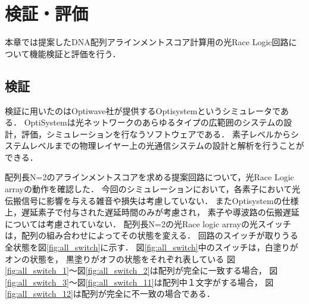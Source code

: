 \chapter{検証・評価}
本章では提案したDNA配列アラインメントスコア計算用の光Race Logic回路について機能検証と評価を行う．
\section{検証}
検証に用いたのはOptiwave社が提供するOptisystemというシミュレータである．
OptiSystemは光ネットワークのあらゆるタイプの広範囲のシステムの設計，評価，シミュレーションを行なうソフトウェアである．
素子レベルからシステムレベルまでの物理レイヤー上の光通信システムの設計と解析を行うことができる．

配列長N=2のアラインメントスコアを求める提案回路について，光Race Logic arrayの動作を確認した．
今回のシミュレーションにおいて，各素子において光伝搬信号に影響を与える雑音や損失は考慮していない．
またOptisystemの仕様上，遅延素子で付与された遅延時間のみが考慮され，
素子や導波路の伝搬遅延については考慮されていない．
配列長N=2の光Race logic arrayの光スイッチは，配列の組み合わせによってその状態を変える．
回路のスイッチが取りうる全状態を図\ref{fig:all_switch}に示す．
図\ref{fig:all_switch}中のスイッチは，白塗りがオンの状態を，
黒塗りがオフの状態をそれぞれ表している
図\ref{fig:all_switch_1}〜図\ref{fig:all_switch_2}は配列が完全に一致する場合，
図\ref{fig:all_switch_3}〜図\ref{fig:all_switch_11}は配列中１文字がする場合，
図\ref{fig:all_switch_12}は配列が完全に不一致の場合である．

